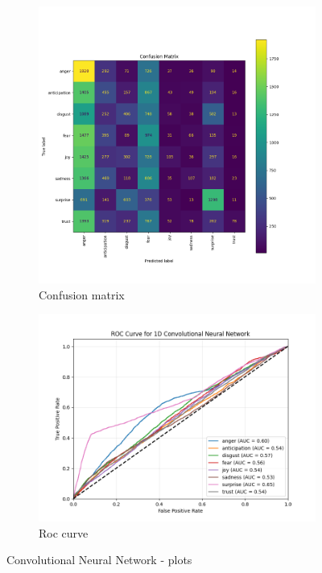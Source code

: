 \begin{figure}[H]
\begin{subfigure}{0.5\textwidth}
        \label{fig:cnn_classacc}
    \end{subfigure}
    \begin{subfigure}{0.53\textwidth}
        \includegraphics[width=\textwidth]{pictures/cnn_confusion_matrix.png}
        \caption{Confusion matrix}
        \label{fig:cnn_confmatr}
    \end{subfigure}
    \begin{subfigure}{0.45\textwidth}
        \includegraphics[width=\textwidth]{pictures/cnn_roc_curve.png}
        \caption{Roc curve}
        \label{fig:cnn_roccurve}
    \end{subfigure}
    \caption{Convolutional Neural Network - plots}
    \label{fig:cnn_performances}
\end{figure}

